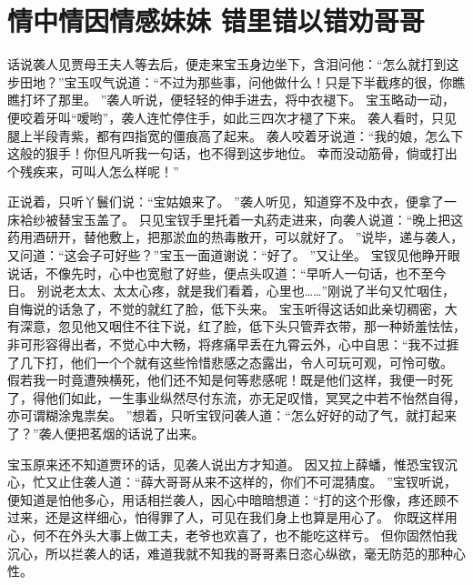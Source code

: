 \chapter{情中情因情感妹妹 \quad 错里错以错劝哥哥}
\par
话说袭人见贾母王夫人等去后，便走来宝玉身边坐下，含泪问他：“怎么就打到这步田地？”宝玉叹气说道：“不过为那些事，问他做什么！只是下半截疼的很，你瞧瞧打坏了那里。
”袭人听说，便轻轻的伸手进去，将中衣褪下。
宝玉略动一动，便咬着牙叫“嗳哟”，袭人连忙停住手，如此三四次才褪了下来。
袭人看时，只见腿上半段青紫，都有四指宽的僵痕高了起来。
袭人咬着牙说道：“我的娘，怎么下这般的狠手！你但凡听我一句话，也不得到这步地位。
幸而没动筋骨，倘或打出个残疾来，可叫人怎么样呢！”\par
正说着，只听丫鬟们说：“宝姑娘来了。
”袭人听见，知道穿不及中衣，便拿了一床袷纱被替宝玉盖了。
只见宝钗手里托着一丸药走进来，向袭人说道：“晚上把这药用酒研开，替他敷上，把那淤血的热毒散开，可以就好了。
”说毕，递与袭人，又问道：“这会子可好些？”宝玉一面道谢说：“好了。
”又让坐。
宝钗见他睁开眼说话，不像先时，心中也宽慰了好些，便点头叹道：“早听人一句话，也不至今日。
别说老太太、太太心疼，就是我们看着，心里也……”刚说了半句又忙咽住，自悔说的话急了，不觉的就红了脸，低下头来。
宝玉听得这话如此亲切稠密，大有深意，忽见他又咽住不往下说，红了脸，低下头只管弄衣带，那一种娇羞怯怯，非可形容得出者，不觉心中大畅，将疼痛早丢在九霄云外，心中自思：“我不过捱了几下打，他们一个个就有这些怜惜悲感之态露出，令人可玩可观，可怜可敬。
假若我一时竟遭殃横死，他们还不知是何等悲感呢！既是他们这样，我便一时死了，得他们如此，一生事业纵然尽付东流，亦无足叹惜，冥冥之中若不怡然自得，亦可谓糊涂鬼祟矣。
”想着，只听宝钗问袭人道：“怎么好好的动了气，就打起来了？”袭人便把茗烟的话说了出来。
\par
宝玉原来还不知道贾环的话，见袭人说出方才知道。
因又拉上薛蟠，惟恐宝钗沉心，忙又止住袭人道：“薛大哥哥从来不这样的，你们不可混猜度。
”宝钗听说，便知道是怕他多心，用话相拦袭人，因心中暗暗想道：“打的这个形像，疼还顾不过来，还是这样细心，怕得罪了人，可见在我们身上也算是用心了。
你既这样用心，何不在外头大事上做工夫，老爷也欢喜了，也不能吃这样亏。
但你固然怕我沉心，所以拦袭人的话，难道我就不知我的哥哥素日恣心纵欲，毫无防范的那种心性。
